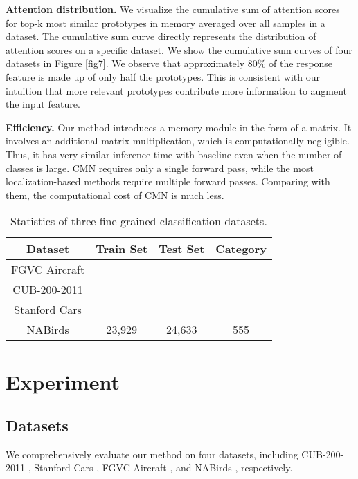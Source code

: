 \documentclass[journal]{IEEEtran}
\begin{document}
\textbf{Attention distribution.} We visualize the cumulative sum of attention scores for top-k most similar prototypes in memory averaged over all samples in a dataset. The cumulative sum curve directly represents the distribution of attention scores on a specific dataset. We show the cumulative sum curves of four datasets in Figure \ref{fig7}.
We observe that approximately 80\% of the response feature is made up of only half the prototypes. This is consistent with our intuition that more relevant prototypes contribute more information to augment the input feature. 

\textbf{Efficiency.} Our method introduces a memory module in the form of a  matrix. It involves an additional matrix multiplication, which is computationally negligible. Thus, it has very similar inference time with baseline even when the number of classes  is large.
CMN requires only a single forward pass, while the most localization-based methods \cite{yang2018learning,zheng2019looking} require multiple forward passes. Comparing with them, the computational cost of CMN is much less.

\setlength{\tabcolsep}{4pt}
\begin{table}[t]
\caption{Statistics of three fine-grained
classification datasets.}
\small
    \begin{center}
    \begin{tabular}{|c|c|c|c|}
    \hline
    Dataset & Train Set & Test Set& Category  \\
    \hline
    \hline
    FGVC Aircraft \cite{maji2013fine} &  &  &  \\
    \hline
    CUB-200-2011 \cite{wah2011caltech} &  &  &  \\
    \hline
    Stanford Cars \cite{krause20133d}  &  &  &  \\
    \hline
    NABirds \cite{van2015building} & 23,929 & 24,633 & 555 \\
    \hline
    \end{tabular}
    \end{center}
\label{data_stat}
\end{table}
\section{Experiment}
\subsection{Datasets}
We comprehensively evaluate our method on four datasets, including CUB-200-2011 \cite{wah2011caltech}, Stanford Cars \cite{krause20133d}, FGVC Aircraft \cite{maji2013fine}, and NABirds \cite{van2015building}, respectively. 
\end{document}
